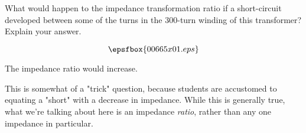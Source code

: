

What would happen to the impedance transformation ratio if a short-circuit developed between some of the turns in the 300-turn winding of this transformer?  Explain your answer.

$$\epsfbox{00665x01.eps}$$







The impedance ratio would increase.







This is somewhat of a "trick" question, because students are accustomed to equating a "short" with a decrease in impedance.  While this is generally true, what we're talking about here is an impedance {\it ratio}, rather than any one impedance in particular.




